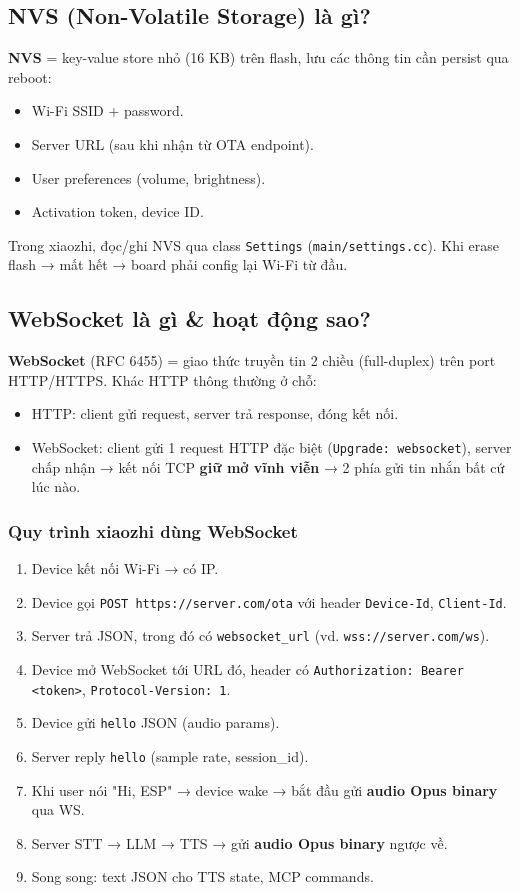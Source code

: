 \documentclass[11pt,a4paper]{article}
\begin{document}
\subsection{NVS (Non-Volatile Storage) là gì?}
\textbf{NVS} = key-value store nhỏ (16 KB) trên flash, lưu các thông tin cần persist qua reboot:
\begin{itemize}
  \item Wi-Fi SSID + password.
  \item Server URL (sau khi nhận từ OTA endpoint).
  \item User preferences (volume, brightness).
  \item Activation token, device ID.
\end{itemize}
Trong xiaozhi, đọc/ghi NVS qua class \texttt{Settings} (\texttt{main/settings.cc}). Khi erase flash → mất hết → board phải config lại Wi-Fi từ đầu.

\subsection{WebSocket là gì \& hoạt động sao?}
\textbf{WebSocket} (RFC 6455) = giao thức truyền tin 2 chiều (full-duplex) trên port HTTP/HTTPS. Khác HTTP thông thường ở chỗ:
\begin{itemize}
  \item HTTP: client gửi request, server trả response, đóng kết nối.
  \item WebSocket: client gửi 1 request HTTP đặc biệt (\texttt{Upgrade: websocket}), server chấp nhận → kết nối TCP \textbf{giữ mở vĩnh viễn} → 2 phía gửi tin nhắn bất cứ lúc nào.
\end{itemize}

\subsubsection*{Quy trình xiaozhi dùng WebSocket}
\begin{enumerate}
  \item Device kết nối Wi-Fi → có IP.
  \item Device gọi \texttt{POST https://server.com/ota} với header \texttt{Device-Id}, \texttt{Client-Id}.
  \item Server trả JSON, trong đó có \texttt{websocket\_url} (vd. \texttt{wss://server.com/ws}).
  \item Device mở WebSocket tới URL đó, header có \texttt{Authorization: Bearer <token>}, \texttt{Protocol-Version: 1}.
  \item Device gửi \texttt{hello} JSON (audio params).
  \item Server reply \texttt{hello} (sample rate, session\_id).
  \item Khi user nói "Hi, ESP" → device wake → bắt đầu gửi \textbf{audio Opus binary} qua WS.
  \item Server STT → LLM → TTS → gửi \textbf{audio Opus binary} ngược về.
  \item Song song: text JSON cho TTS state, MCP commands.
\end{enumerate}
\end{document}
